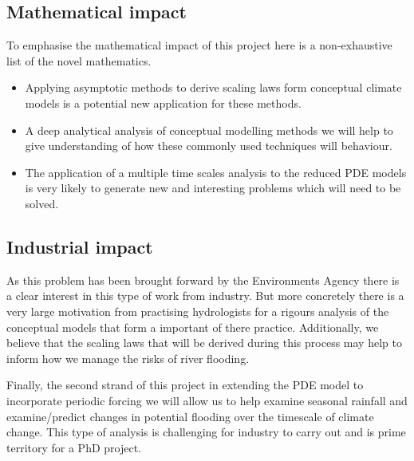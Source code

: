 \documentclass[11pt]{article}
\begin{document}
\subsection{Mathematical impact}
To emphasise the mathematical impact of this project here is a non-exhaustive list of the novel mathematics. 
\begin{itemize}
    \item Applying asymptotic methods to derive scaling laws form conceptual climate models is a potential new application for these methods.
    \item A deep analytical analysis of conceptual modelling methods we will help to give understanding of how these commonly used techniques will behaviour.
    \item The application of a multiple time scales analysis to the reduced PDE models is very likely to generate new and interesting problems which will need to be solved.
\end{itemize}

\subsection{Industrial impact}
As this problem has been brought forward by the Environments Agency there is a clear interest in this type of work from industry. But more concretely there is a very large motivation from practising hydrologists for a rigours analysis of the conceptual models that form a important of there practice. Additionally, we believe that the scaling laws that will be derived during this process may help to inform how we manage the risks of river flooding.

Finally, the second strand of this project in extending the PDE model to incorporate periodic forcing we will allow us to help examine seasonal rainfall and examine/predict changes in potential flooding over the timescale of climate change. This type of analysis is challenging for industry to carry out and is prime territory for a PhD project.




\printbibliography
\end{document}
